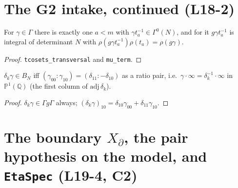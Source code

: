 \section{The G2 intake, continued (L18-2)}

\begin{proposition}\label{prop:mu-assembled}
  \leanok
  For $\gamma\in\Gamma$ there is exactly one $a<m$ with $\gamma t_a^{-1}\in\Gamma^0(N)$, and for it $g\gamma t_a^{-1}$ is integral of
  determinant $N$ with $\rho(g\gamma t_a^{-1})\rho(t_a)=\rho(g\gamma)$.
\end{proposition}
\begin{proof}
  \leanok
  \texttt{tcosets\_transversal} and \texttt{mu\_term}.
\end{proof}

\begin{proposition}\label{prop:bdrycosets-cusp}
  \leanok
  $\delta_k\gamma\in B_N$ iff $(\gamma_{00}:\gamma_{10})=(\delta_{11}:-\delta_{10})$ as a ratio pair, i.e.\
  $\gamma\cdot\infty=\delta_k^{-1}\cdot\infty$ in $\mathbb P^1(\mathbb Q)$ (the first column of $\mathrm{adj}\,\delta_k$).
\end{proposition}
\begin{proof}
  \leanok
  $\delta_k\gamma\in\Gamma g\Gamma$ always; $(\delta_k\gamma)_{10}=\delta_{10}\gamma_{00}+\delta_{11}\gamma_{10}$.
\end{proof}

\section{The boundary \texorpdfstring{$X_\partial$}{X\_d}, the pair hypothesis on the model, and \texttt{EtaSpec} (L19-4, C2)}

